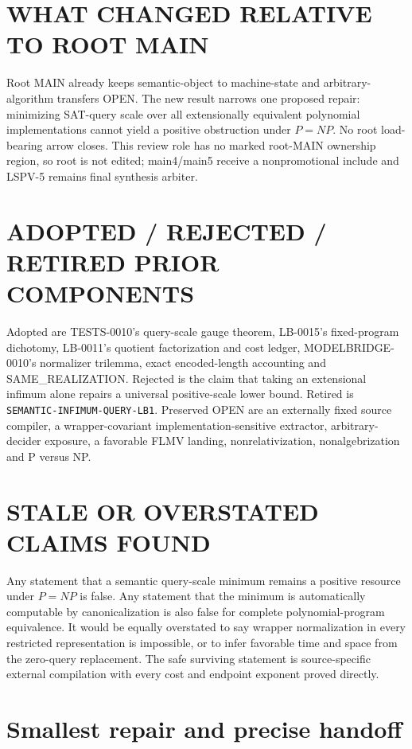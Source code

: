 \documentclass[11pt]{article}
\begin{document}
\section{WHAT CHANGED RELATIVE TO ROOT MAIN}

Root MAIN already keeps semantic-object to machine-state and arbitrary-
algorithm transfers OPEN.  The new result narrows one proposed repair:
minimizing SAT-query scale over all extensionally equivalent polynomial
implementations cannot yield a positive obstruction under $P=NP$.  No root
load-bearing arrow closes.  This review role has no marked root-MAIN ownership
region, so root  is not edited; main4/main5 receive a
nonpromotional include and LSPV-5 remains final synthesis arbiter.

\section{ADOPTED / REJECTED / RETIRED PRIOR COMPONENTS}

Adopted are TESTS-0010's query-scale gauge theorem, LB-0015's fixed-program
dichotomy, LB-0011's quotient factorization and cost ledger,
MODELBRIDGE-0010's normalizer trilemma, exact encoded-length accounting and
SAME\_REALIZATION.  Rejected is the claim that taking an extensional infimum
alone repairs a universal positive-scale lower bound.  Retired is
\texttt{SEMANTIC-INFIMUM-QUERY-LB1}.  Preserved OPEN are an externally fixed
source compiler, a wrapper-covariant implementation-sensitive extractor,
arbitrary-decider exposure, a favorable FLMV landing, nonrelativization,
nonalgebrization and P versus NP.

\section{STALE OR OVERSTATED CLAIMS FOUND}

Any statement that a semantic query-scale minimum remains a positive resource
under $P=NP$ is false.  Any statement that the minimum is automatically
computable by canonicalization is also false for complete polynomial-program
equivalence.  It would be equally overstated to say wrapper normalization in
every restricted representation is impossible, or to infer favorable time
and space from the zero-query replacement.  The safe surviving statement is
source-specific external compilation with every cost and endpoint exponent
proved directly.

\section{Smallest repair and precise handoff}
\end{document}
